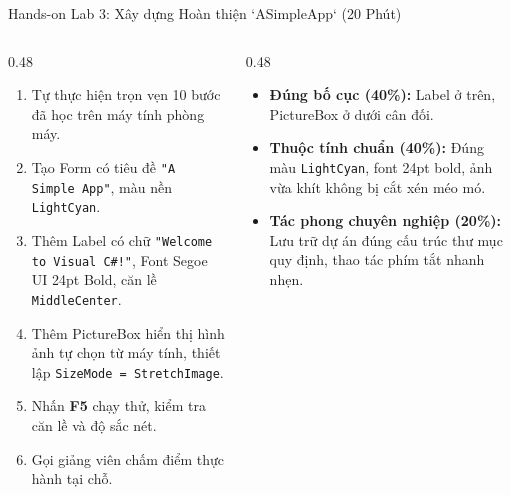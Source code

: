 \documentclass[aspectratio=169, 10pt]{beamer}
\begin{document}
\begin{frame}{Hands-on Lab 3: Xây dựng Hoàn thiện `ASimpleApp` (20 Phút)}
  \begin{columns}[T]
    \begin{column}{0.48\textwidth}
      \begin{tcolorbox}[colback=UniGreen!5,colframe=UniGreen,title=\textbf{NHIỆM VỤ THỰC HÀNH CÁ NHÂN:},fonttitle=\small\bfseries]
        \begin{enumerate}\small
          \item Tự thực hiện trọn vẹn 10 bước đã học trên máy tính phòng máy.
          \item Tạo Form có tiêu đề \texttt{"A Simple App"}, màu nền \texttt{LightCyan}.
          \item Thêm Label có chữ \texttt{"Welcome to Visual C\#!"}, Font Segoe UI 24pt Bold, căn lề \texttt{MiddleCenter}.
          \item Thêm PictureBox hiển thị hình ảnh tự chọn từ máy tính, thiết lập \texttt{SizeMode = StretchImage}.
          \item Nhấn \textbf{F5} chạy thử, kiểm tra căn lề và độ sắc nét.
          \item Gọi giảng viên chấm điểm thực hành tại chỗ.
        \end{enumerate}
      \end{tcolorbox}
    \end{column}

    \begin{column}{0.48\textwidth}
      \begin{tcolorbox}[colback=UniNavy!5,colframe=UniNavy,title=\textbf{TIÊU CHÍ ĐÁNH GIÁ (RUBRICS):},fonttitle=\small\bfseries]
        \begin{itemize}\small
          \item \textbf{Đúng bố cục (40\%):} Label ở trên, PictureBox ở dưới cân đối.
          \item \textbf{Thuộc tính chuẩn (40\%):} Đúng màu \texttt{LightCyan}, font 24pt bold, ảnh vừa khít không bị cắt xén méo mó.
          \item \textbf{Tác phong chuyên nghiệp (20\%):} Lưu trữ dự án đúng cấu trúc thư mục quy định, thao tác phím tắt nhanh nhẹn.
        \end{itemize}
      \end{tcolorbox}
    \end{column}
  \end{columns}
\end{frame}
\end{document}
